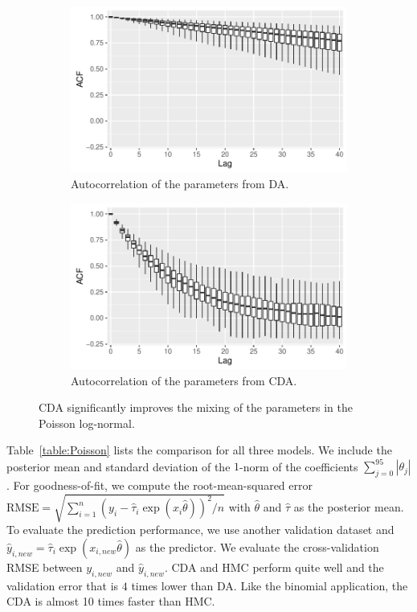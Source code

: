 \documentclass[10pt]{article}
\begin{document}
 \begin{figure}[H]
  \begin{subfigure}[b]{0.45\textwidth}
 \includegraphics[width=1\textwidth]{poisson_acf_da}
 \caption{Autocorrelation of the parameters from DA.}
 \end{subfigure}
  \hfill 
 \begin{subfigure}[b]{0.45\textwidth}
 \includegraphics[width=1\textwidth]{poisson_acf_cda}
 \caption{Autocorrelation of the parameters from CDA.}
 \end{subfigure}
 \caption{CDA significantly improves the mixing of the parameters in the Poisson log-normal.}
 \label{data_poisson}
 \end{figure}

Table~\ref{table:Poisson} lists the comparison for all three models. We include the posterior mean and standard deviation of the $1$-norm of the coefficients $\sum_{j=0}^{95} |\theta_j|$. For goodness-of-fit, we compute the root-mean-squared error $\text{RMSE}= \sqrt{ \sum_{i=1}^n  (y_i-\hat\tau_i\exp( x_i{\hat\theta}))^2/n}$ with ${\hat\theta}$ and $\hat\tau$ as the posterior mean. To evaluate the prediction performance, we use another validation dataset and $\hat y_{i,new}=\hat\tau_i\exp( x_{i,new}{\hat\theta})$ as the predictor. We evaluate the cross-validation RMSE between $y_{i,new}$ and $\hat y_{i,new}$. CDA and HMC perform quite well and the validation error that is $4$ times lower than DA. Like the binomial application, the CDA is almost 10 times faster than HMC.
\end{document}
